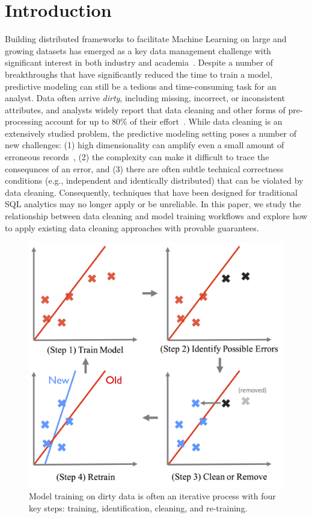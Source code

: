 \section{Introduction}
Building distributed frameworks to facilitate Machine Learning on large and growing datasets has emerged as a key data management challenge with significant interest in both industry and academia~\cite{bdas, alexandrov2014stratosphere, crotty2014tupleware, tensor}.
Despite a number of breakthroughs that have significantly reduced the time to train a model, predictive modeling can still be a tedious and time-consuming task for an analyst. 
Data often arrive \emph{dirty}, including missing, incorrect, or inconsistent attributes, and analysts widely report that data cleaning and other forms of pre-processing account for up to 80\% of their effort~\cite{nytimes, kandel2012}.
While data cleaning is an extensively studied problem, the predictive modeling setting poses a number of new challenges: (1) high dimensionality can amplify even a small amount of erroneous records~\cite{xiaofeature}, (2) the complexity can make it difficult to trace the consequnces of an error, and (3) there are often subtle technical correctness conditions (e.g., independent and identically distributed) that can be violated by data cleaning.
Consequently, techniques that have been designed for traditional SQL analytics may no longer apply or be unreliable.
In this paper, we study the relationship between data cleaning and model training workflows and explore how to apply existing data cleaning approaches with provable guarantees.

\begin{figure}[t]
\centering
 \includegraphics[width=0.8\columnwidth]{figs/update-arch4.png}
 \caption{Model training on dirty data is often an iterative process with four key steps: training, identification, cleaning, and re-training. \label{teaser}}\vspace{-1.5em}
\end{figure}

